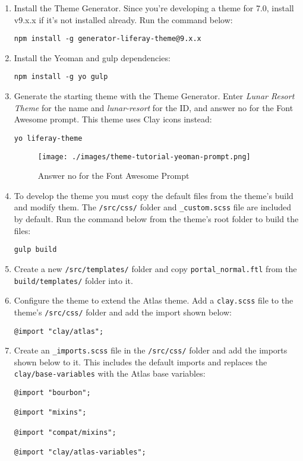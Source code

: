 \begin{enumerate}
\def\labelenumi{\arabic{enumi}.}
\item
  Install the Theme Generator. Since you're developing a theme for 7.0,
  install v9.x.x if it's not installed already. Run the command below:

\begin{verbatim}
npm install -g generator-liferay-theme@9.x.x
\end{verbatim}
\item
  Install the Yeoman and gulp dependencies:

\begin{verbatim}
npm install -g yo gulp
\end{verbatim}
\item
  Generate the starting theme with the Theme Generator. Enter
  \emph{Lunar Resort Theme} for the name and \emph{lunar-resort} for the
  ID, and answer no for the Font Awesome prompt. This theme uses Clay
  icons instead:

\begin{verbatim}
yo liferay-theme
\end{verbatim}

  \begin{figure}
  \centering
  \texttt{[image: ./images/theme-tutorial-yeoman-prompt.png]}
  \caption{Answer no for the Font Awesome Prompt}
  \end{figure}
\item
  To develop the theme you must copy the default files from the theme's
  build and modify them. The \texttt{/src/css/} folder and
  \texttt{\_custom.scss} file are included by default. Run the command
  below from the theme's root folder to build the files:

\begin{verbatim}
gulp build
\end{verbatim}
\item
  Create a new \texttt{/src/templates/} folder and copy
  \texttt{portal\_normal.ftl} from the \texttt{build/templates/} folder
  into it.
\item
  Configure the theme to extend the Atlas theme. Add a
  \texttt{clay.scss} file to the theme's \texttt{/src/css/} folder and
  add the import shown below:

\begin{verbatim}
@import "clay/atlas";
\end{verbatim}
\item
  Create an \texttt{\_imports.scss} file in the \texttt{/src/css/}
  folder and add the imports shown below to it. This includes the
  default imports and replaces the \texttt{clay/base-variables} with the
  Atlas base variables:

\begin{verbatim}
@import "bourbon";

@import "mixins";

@import "compat/mixins";

@import "clay/atlas-variables";
\end{verbatim}
\end{enumerate}

